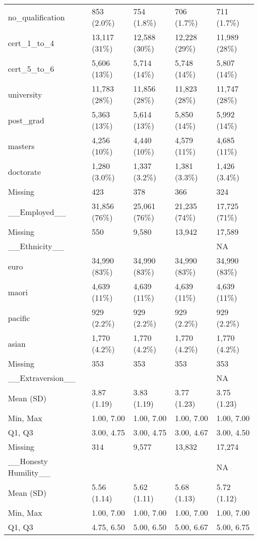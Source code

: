 \documentclass[
  single column]{article}
\begin{document}
\begin{longtable}[t]{lllll}
no\_qualification & 853 (2.0\%) & 754 (1.8\%) & 706 (1.7\%) & 711 (1.7\%)\\
cert\_1\_to\_4 & 13,117 (31\%) & 12,588 (30\%) & 12,228 (29\%) & 11,989 (28\%)\\
\addlinespace
cert\_5\_to\_6 & 5,606 (13\%) & 5,714 (14\%) & 5,748 (14\%) & 5,807 (14\%)\\
university & 11,783 (28\%) & 11,856 (28\%) & 11,823 (28\%) & 11,747 (28\%)\\
post\_grad & 5,363 (13\%) & 5,614 (13\%) & 5,850 (14\%) & 5,992 (14\%)\\
masters & 4,256 (10\%) & 4,440 (10\%) & 4,579 (11\%) & 4,685 (11\%)\\
doctorate & 1,280 (3.0\%) & 1,337 (3.2\%) & 1,381 (3.3\%) & 1,426 (3.4\%)\\
\addlinespace
Missing & 423 & 378 & 366 & 324\\
\_\_Employed\_\_ & 31,856 (76\%) & 25,061 (76\%) & 21,235 (74\%) & 17,725 (71\%)\\
Missing & 550 & 9,580 & 13,942 & 17,589\\
\_\_Ethnicity\_\_ &   ~~&   ~~&   ~~& NA\\
euro & 34,990 (83\%) & 34,990 (83\%) & 34,990 (83\%) & 34,990 (83\%)\\
\addlinespace
maori & 4,639 (11\%) & 4,639 (11\%) & 4,639 (11\%) & 4,639 (11\%)\\
pacific & 929 (2.2\%) & 929 (2.2\%) & 929 (2.2\%) & 929 (2.2\%)\\
asian & 1,770 (4.2\%) & 1,770 (4.2\%) & 1,770 (4.2\%) & 1,770 (4.2\%)\\
Missing & 353 & 353 & 353 & 353\\
\_\_Extraversion\_\_ &   ~~&   ~~&   ~~& NA\\
\addlinespace
Mean (SD) & 3.87 (1.19) & 3.83 (1.19) & 3.77 (1.23) & 3.75 (1.23)\\
Min, Max & 1.00, 7.00 & 1.00, 7.00 & 1.00, 7.00 & 1.00, 7.00\\
Q1, Q3 & 3.00, 4.75 & 3.00, 4.75 & 3.00, 4.67 & 3.00, 4.50\\
Missing & 314 & 9,577 & 13,832 & 17,274\\
\_\_Honesty Humility\_\_ &   ~~&   ~~&   ~~& NA\\
\addlinespace
Mean (SD) & 5.56 (1.14) & 5.62 (1.11) & 5.68 (1.13) & 5.72 (1.12)\\
Min, Max & 1.00, 7.00 & 1.00, 7.00 & 1.00, 7.00 & 1.00, 7.00\\
Q1, Q3 & 4.75, 6.50 & 5.00, 6.50 & 5.00, 6.67 & 5.00, 6.75\\

\end{longtable}
\end{document}
